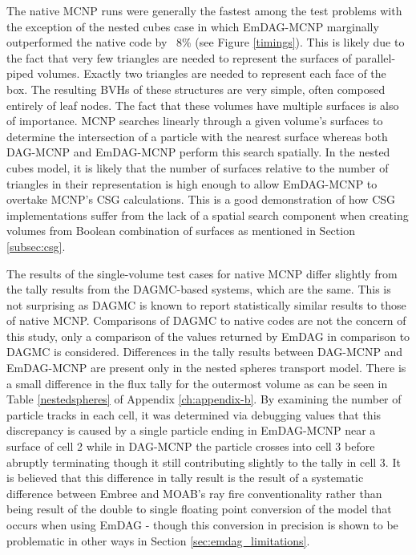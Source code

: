 The native MCNP runs were generally the fastest among the test problems with the
exception of the nested cubes case in which EmDAG-MCNP marginally outperformed
the native code by ~8\% (see Figure \ref{timings}). This is likely due to the
fact that very few triangles are needed to represent the surfaces of
parallel-piped volumes. Exactly two triangles are needed to represent each face
of the box. The resulting BVHs of these structures are very simple, often
composed entirely of leaf nodes.  The fact that these volumes have multiple
surfaces is also of importance. MCNP searches linearly through a given
volume's surfaces to determine the intersection of a particle with the
nearest surface whereas both DAG-MCNP and EmDAG-MCNP perform this search
spatially. In the nested cubes model, it is likely that the number of surfaces
relative to the number of triangles in their representation is high enough to
allow EmDAG-MCNP to overtake MCNP's CSG calculations. This is a good
demonstration of how CSG implementations suffer from the lack of a spatial
search component when creating volumes from Boolean combination of surfaces as
mentioned in Section \ref{subsec:csg}.

The results of the single-volume test cases for native MCNP differ slightly from
the tally results from the DAGMC-based systems, which are the same. This is not
surprising as DAGMC is known to report statistically similar results to those of
native MCNP. Comparisons of DAGMC to native codes are not the concern of this
study, only a comparison of the values returned by EmDAG in comparison to DAGMC
is considered. Differences in the tally results between DAG-MCNP and EmDAG-MCNP
are present only in the nested spheres transport model. There is a small
difference in the flux tally for the outermost volume as can be seen in Table
\ref{nestedspheres} of Appendix \ref{ch:appendix-b}. By examining the number of
particle tracks in each cell, it was determined via debugging values that this
discrepancy is caused by a single particle ending in EmDAG-MCNP near a surface
of cell 2 while in DAG-MCNP the particle crosses into cell 3 before abruptly
terminating though it still contributing slightly to the tally in cell 3. It is
believed that this difference in tally result is the result of a systematic
difference between Embree and MOAB's ray fire conventionality rather than being
result of the double to single floating point conversion of the model that
occurs when using EmDAG - though this conversion in precision is shown to be
problematic in other ways in Section \ref{sec:emdag_limitations}.

